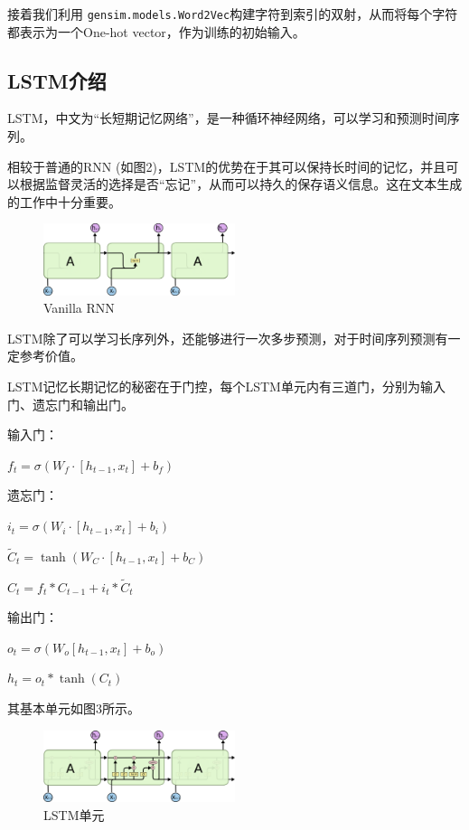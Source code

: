 \documentclass[12pt,a4paper]{article}
\begin{document}
    接着我们利用 \verb|gensim.models.Word2Vec|构建字符到索引的双射，从而将每个字符都表示为一个One-hot vector，作为训练的初始输入。
\subsection{LSTM介绍}
    LSTM，中文为“长短期记忆网络”，是一种循环神经网络，可以学习和预测时间序列。
    
相较于普通的RNN (如图2)，LSTM的优势在于其可以保持长时间的记忆，并且可以根据监督灵活的选择是否“忘记”，从而可以持久的保存语义信息。这在文本生成的工作中十分重要。
    
    \begin{figure}[!h]
        \centering
        \includegraphics[width=0.5\textwidth]{图片8.png}
        \caption{Vanilla RNN}
    \end{figure}
    
    LSTM除了可以学习长序列外，还能够进行一次多步预测，对于时间序列预测有一定参考价值。
    
    LSTM记忆长期记忆的秘密在于门控，每个LSTM单元内有三道门，分别为输入门、遗忘门和输出门。

    输入门：
    
    $f_{t}=\sigma\left(W_{f} \cdot\left[h_{t-1}, x_{t}\right]+b_{f}\right)$
    
    遗忘门：
    
    $i_{t}=\sigma\left(W_{i} \cdot\left[h_{t-1}, x_{t}\right]+b_{i}\right)$
    
    $\tilde{C}_{t}=\tanh \left(W_{C} \cdot\left[h_{t-1}, x_{t}\right]+b_{C}\right)$
    
    $C_{t}=f_{t} * C_{t-1}+i_{t} * \tilde{C}_{t}$
    
    输出门：
    
    $o_{t}=\sigma\left(W_{o}\left[h_{t-1}, x_{t}\right]+b_{o}\right)$
    
    $h_{t}=o_{t} * \tanh \left(C_{t}\right)$
    
   其基本单元如图3所示。\cite{ref3}
    \begin{figure}[!h]
        \centering
        \includegraphics[width=0.5\textwidth]{图片7.png}
        \caption{LSTM单元}
    \end{figure}
\end{document}
